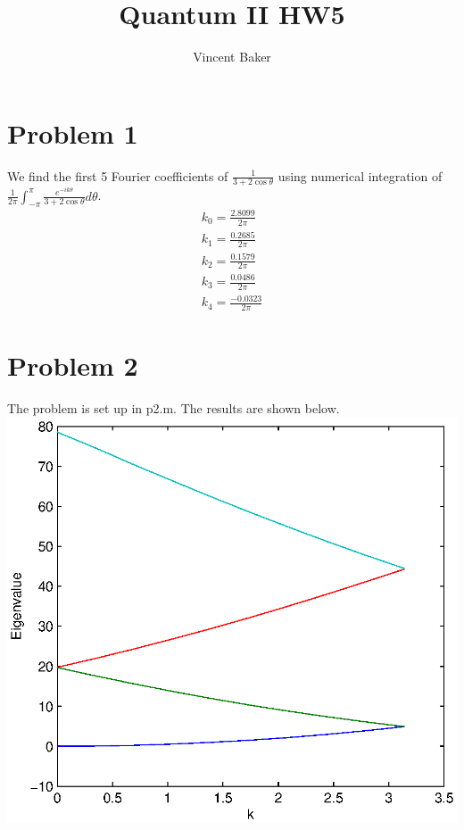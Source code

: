 \documentclass[a4paper,11pt]{article}
\title{Quantum II HW5}
\author{Vincent Baker}
\numberwithin{equation}{section}
\begin{document}
\maketitle

\section{Problem 1}
We find the first 5 Fourier coefficients of $ \frac{1}{3+2\cos{\theta}}$ using numerical integration of $\frac{1}{2\pi}\int_{-\pi}^{\pi}\frac{e^{-ik\theta}}{3+2\cos{\theta}} d\theta $.
\begin{gather}
 k_0 = \frac{2.8099}{2\pi}\\
 k_1 = \frac{0.2685}{2\pi}\\
 k_2 = \frac{0.1579}{2\pi}\\
 k_3 = \frac{0.0486}{2\pi}\\
 k_4 = \frac{-0.0323}{2\pi}
\end{gather}

\section{Problem 2}
The problem is set up in p2.m. The results are shown below.\\
\includegraphics{p2}
\\
\end{document}
